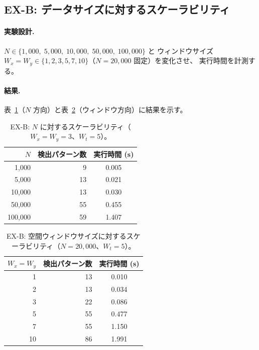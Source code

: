 \subsection{EX-B: データサイズに対するスケーラビリティ}
\label{sec:ex_b}

\paragraph{実験設計.}
$N \in \{1{,}000,\; 5{,}000,\; 10{,}000,\; 50{,}000,\; 100{,}000\}$ と
ウィンドウサイズ $W_x = W_y \in \{1, 2, 3, 5, 7, 10\}$（$N = 20{,}000$ 固定）を変化させ、
実行時間を計測する。

\paragraph{結果.}
表~\ref{tab:ex_b_n}（$N$ 方向）と表~\ref{tab:ex_b_w}（ウィンドウ方向）に結果を示す。

\begin{table}[t]
\centering
\caption{EX-B: $N$ に対するスケーラビリティ（$W_x{=}W_y{=}3$、$W_t{=}5$）。}
\label{tab:ex_b_n}
\small
\begin{tabular}{rrc}
\toprule
$N$ & 検出パターン数 & 実行時間 (s) \\
\midrule
1,000   & 9  & 0.005 \\
5,000   & 13 & 0.021 \\
10,000  & 13 & 0.030 \\
50,000  & 55 & 0.455 \\
100,000 & 59 & 1.407 \\
\bottomrule
\end{tabular}
\end{table}

\begin{table}[t]
\centering
\caption{EX-B: 空間ウィンドウサイズに対するスケーラビリティ（$N{=}20{,}000$、$W_t{=}5$）。}
\label{tab:ex_b_w}
\small
\begin{tabular}{rrc}
\toprule
$W_x = W_y$ & 検出パターン数 & 実行時間 (s) \\
\midrule
1  & 13 & 0.010 \\
2  & 13 & 0.034 \\
3  & 22 & 0.086 \\
5  & 55 & 0.477 \\
7  & 55 & 1.150 \\
10 & 86 & 1.991 \\
\bottomrule
\end{tabular}
\end{table}

